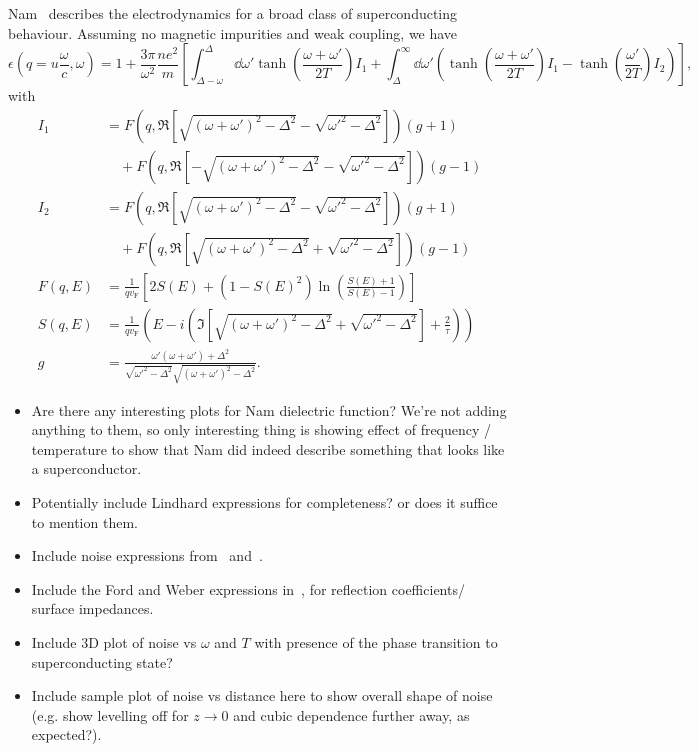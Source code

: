 \documentclass{article}
\newcommand{\vf}{v_{\mathrm{F}}}
\begin{document}
	Nam~\cite{Nam1967} describes the electrodynamics for a broad class of superconducting behaviour.
	Assuming no magnetic impurities and weak coupling, we have
	\begin{equation}
		\epsilon(q = u \frac{\omega}{c}, \omega) = 1 + \frac{3 \pi}{\omega^2} \frac{n e^2}{m} \left[\int_{\Delta - \omega}^{\Delta}\dd{\omega'} \tanh(\frac{\omega + \omega'}{2 T}) I_1 + \int_{\Delta}^{\infty} \dd{\omega'} \left( \tanh(\frac{\omega + \omega'}{2 T}) I_1  - \tanh(\frac{\omega'}{2 T})I_2 \right) \right],
	\end{equation}
	with
	\begin{align}
		I_1 &= F(q, \Re[\sqrt{(\omega + \omega')^2 - \Delta^2} - \sqrt{\omega'^2 - \Delta^2}]) (g + 1) \nonumber\\
		&\quad + F(q, \Re[-\sqrt{(\omega + \omega')^2 - \Delta^2} - \sqrt{\omega'^2 - \Delta^2}]) (g - 1) \\
		I_2 &= F(q, \Re[\sqrt{(\omega + \omega')^2 - \Delta^2} - \sqrt{\omega'^2 - \Delta^2}]) (g + 1) \nonumber\\
		&\quad + F(q, \Re[\sqrt{(\omega +  \omega')^2 - \Delta^2} + \sqrt{\omega'^2 - \Delta^2}]) (g - 1) \\
		F(q, E) &= \frac{1}{q \vf} \left[2 S(E) + (1 - S(E)^2)\ln(\frac{S(E) + 1}{S(E) - 1})\right]  \\
		S(q, E) &= \frac{1}{q \vf} \left( E - i \left(\Im[\sqrt{(\omega + \omega')^2 - \Delta^2} + \sqrt{\omega'^2 - \Delta^2}] + \frac{2}{\tau} \right) \right) \\
		g &= \frac{\omega' \left(\omega + \omega'\right) + \Delta^2}{\sqrt{\omega'^2 - \Delta^2}\sqrt{(\omega + \omega')^2 - \Delta^2}}.
	\end{align}

\begin{itemize}

	\item Are there any interesting plots for Nam dielectric function?
	We're not adding anything to them, so only interesting thing is showing effect of frequency / temperature to show that Nam did indeed describe something that looks like a superconductor.
	\item Potentially include Lindhard expressions for completeness? or does it suffice to mention them.
	\item Include noise expressions from~\cite{QubitRelax} and~\cite{Henkel1999}.
	\item Include the Ford and Weber expressions in~\cite{Ford1984}, for reflection coefficients/ surface impedances.
	\item Include 3D plot of noise vs $\omega$ and $T$ with presence of the phase transition to superconducting state?
	\item Include sample plot of noise vs distance here to show overall shape of noise (e.g. show levelling off for $z \rightarrow 0$ and cubic dependence further away, as expected?).
\end{itemize}
\end{document}
